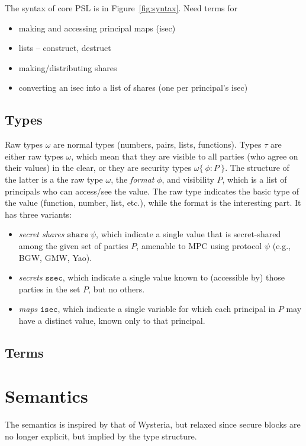 \documentclass[10pt]{article}
\newcommand{\ssec}{\ensuremath{\mathtt{ssec}}}
\newcommand{\isec}{\ensuremath{\mathtt{isec}}}
\newcommand{\sshare}[1]{\ensuremath{\mathtt{share}~{#1}}}
\newcommand{\sectyp}[3]{\ensuremath{{#1} \{~{#2}:{#3}~\}}}
\begin{document}
The syntax of core PSL is in Figure~\ref{fig:syntax}. Need terms for
\begin{itemize}
\item making and accessing principal maps (isec)
\item lists -- construct, destruct
\item making/distributing shares
\item converting an isec into a list of shares (one per principal's
  isec)
\end{itemize}

\subsection{Types}

Raw types $\omega$ are normal types (numbers, pairs, lists,
functions). Types $\tau$ are either raw types $\omega$, which mean
that they are visible to all parties (who agree on their values) in
the clear, or they are security types $\sectyp{\omega}{\phi}{P}$. The
structure of the latter is a the raw type $\omega$, the \emph{format}
$\phi$, and visibility $P$, which is a list of principals who can
access/see the value.  The raw type indicates the basic type of the
value (function, number, list, etc.), while the format is the
interesting part. It has three variants:
\begin{itemize}
\item \emph{secret shares} $\sshare\psi$, which indicate a single
  value that is secret-shared among the given set of parties $P$,
  amenable to MPC using protocol $\psi$ (e.g., BGW, GMW, Yao).
\item \emph{secrets} \ssec, which indicate a single value known to
  (accessible by) those parties in the set $P$, but no others.
\item \emph{maps} \isec, which indicate a single variable for which
  each principal in $P$ may have a distinct value, known only to that
  principal. 
\end{itemize}

\subsection{Terms}

\section{Semantics}

The semantics is inspired by that of Wysteria, but relaxed since
secure blocks are no longer explicit, but implied by the type
structure.
\end{document}
